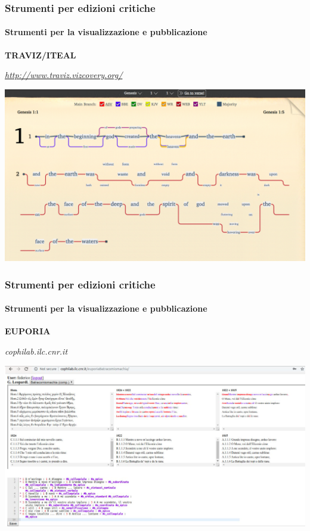 \begin{frame}
    \frametitle{Strumenti per edizioni critiche}
    \framesubtitle{Strumenti per la visualizzazione e pubblicazione}
	\addtocounter{nframe}{1}
    \begin{center}
        \textbf{TRAVIZ/ITEAL}
    \end{center}
    \begin{center}
        \textit{\url{http://www.traviz.vizcovery.org/}}
	\end{center}
    \begin{center}
        \includegraphics[width=.95\textwidth]{imgs/traviz.png}
	\end{center}
\end{frame}

\begin{frame}
    \frametitle{Strumenti per edizioni critiche}
    \framesubtitle{Strumenti per la visualizzazione e pubblicazione}
	\addtocounter{nframe}{1}
    \begin{center}
        \textbf{EUPORIA}
    \end{center}
    \begin{center}
        \textit{cophilab.ilc.cnr.it}
	\end{center}
    \begin{center}
        \includegraphics[width=.95\textwidth]{imgs/euporia.png}
	\end{center}
\end{frame}

